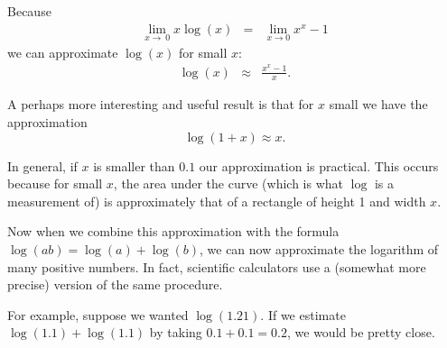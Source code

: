 \documentclass[12pt]{article}
\begin{document}
Because
\begin{eqnarray*}
\lim_{x\rightarrow\ 0} x \log\left(x\right) &=& \lim_{x\rightarrow 0}  x^x - 1
\end{eqnarray*}
we can approximate $\log{\left(x\right)}$ for small $x$:
\begin{eqnarray*}
\log\left(x\right) &\approx& \frac{ x^x - 1 }{ x }.
\end{eqnarray*}

A perhaps more interesting and useful result is that for $x$ small we have the approximation
\[ \log{(1+x)} \approx x. \]

In general, if $x$ is smaller than $0.1$ our approximation is practical.  This occurs because for small $x$, the area under the curve (which is what $\log$ is a measurement of) is approximately that of a rectangle of height 1 and width $x$.

Now when we combine this approximation with the formula $\log(ab)=\log(a) + \log(b)$, we can now approximate the logarithm of many positive numbers.  In fact, scientific calculators use a (somewhat more precise) version of the same procedure.

For example, suppose we wanted $\log(1.21)$.  If we estimate $\log(1.1) + \log(1.1)$ by taking $0.1 + 0.1 = 0.2$, we would be pretty close.
\end{document}
